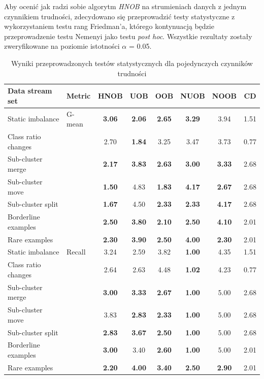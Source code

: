 \noindent Aby ocenić jak radzi sobie algorytm \textit{HNOB} na strumieniach danych z jednym czynnikiem trudności, zdecydowano się przeprowadzić testy statystyczne z wykorzystaniem testu rang Friedman'a, którego kontynuacją będzie przeprowadzenie testu Nemenyi jako testu \textit{post hoc}. Wszystkie rezultaty zostały zweryfikowane na poziomie istotności $\alpha$ = 0.05.

\begin{table}[ht]
\centering\small%
\setlength{\tabcolsep}{10pt} 
\renewcommand{\arraystretch}{1.5} 
\begin{tabular}{l l c c c c c c}
\toprule
Data stream set & Metric & HNOB & UOB & OOB & NUOB & NOOB & CD \\
\midrule
Static imbalance & G-mean & \textbf{3.06} & \textbf{2.06} & \textbf{2.65} & \textbf{3.29} & 3.94 & 1.51 \\
Class ratio changes & & 2.70 & \textbf{1.84} & 3.25 & 3.47 & 3.73 & 0.77 \\
Sub-cluster merge & & \textbf{2.17} & \textbf{3.83} & \textbf{2.63} & \textbf{3.00} & \textbf{3.33} & 2.68 \\
Sub-cluster move & & \textbf{1.50} & 4.83 & \textbf{1.83} & \textbf{4.17} & \textbf{2.67} & 2.68 \\
Sub-cluster split & & \textbf{1.67} & 4.50 & \textbf{2.33} & \textbf{2.33} & \textbf{4.17} & 2.68 \\
Borderline examples & & \textbf{2.50} & \textbf{3.80} & \textbf{2.10} & \textbf{2.50} & \textbf{4.10} & 2.01 \\
Rare examples & & \textbf{2.30} & \textbf{3.90} & \textbf{2.50} & \textbf{4.00} & \textbf{2.30} & 2.01 \\
Static imbalance & Recall & 3.24 & 2.59 & 3.82 & \textbf{1.00} & 4.35 & 1.51 \\
Class ratio changes & & 2.64 & 2.63 & 4.48 & \textbf{1.02} & 4.23 & 0.77 \\
Sub-cluster merge & & \textbf{3.00} & \textbf{3.33} & \textbf{2.67} & \textbf{1.00} & 5.00 & 2.68 \\
Sub-cluster move & & 3.83 & \textbf{2.83} & \textbf{2.33} & \textbf{1.00} & 5.00 & 2.68 \\
Sub-cluster split & & \textbf{2.83} & \textbf{3.67} & \textbf{2.50} & \textbf{1.00} & 5.00 & 2.68 \\
Borderline examples & & \textbf{3.00} & 3.40 & \textbf{2.60} & \textbf{1.00} & 5.00 & 2.01 \\
Rare examples & & \textbf{2.20} & \textbf{4.00} & \textbf{3.40} & \textbf{2.50} & \textbf{2.90} & 2.01 \\
\bottomrule
\end{tabular}
\caption{Wyniki przeprowadzonych testów statystycznych dla pojedynczych czynników trudności}\label{Tab:SingleDriftFriedmanHNOB}
\end{table}

